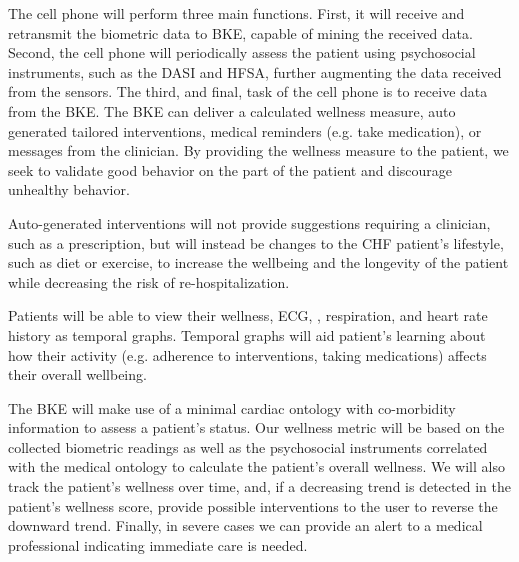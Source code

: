The cell phone will perform three main functions. First, it will receive and retransmit the biometric data to BKE, capable of mining the received data. Second, the cell phone will periodically assess the patient using psychosocial instruments, such as the DASI and HFSA, further augmenting the data received from the sensors. The third, and final, task of the cell phone is to receive data from the BKE. The BKE can deliver a calculated wellness measure, auto generated tailored interventions, medical reminders (e.g. take medication), or messages from the clinician. By providing the wellness measure to the patient, we seek to validate good behavior on the part of the patient and discourage unhealthy behavior. 

Auto-generated interventions will not provide suggestions requiring a clinician, such as a prescription, but will instead be changes to the CHF patient's lifestyle, such as diet or exercise, to increase the wellbeing and the longevity of the patient while decreasing the risk of re-hospitalization. 

Patients will be able to view their wellness, ECG, , respiration, and heart rate history as temporal graphs. Temporal graphs will aid patient's learning about how their activity (e.g. adherence to interventions, taking medications) affects their overall wellbeing.

The BKE will make use of a minimal cardiac ontology with co-morbidity information to assess a patient's status. Our wellness metric will be based on the collected biometric readings as well as the psychosocial instruments correlated with the medical ontology to calculate the patient's overall wellness. We will also track the patient's wellness over time, and, if a decreasing trend is detected in the patient's wellness score, provide possible interventions to the user to reverse the downward trend. Finally, in severe cases we can provide an alert to a medical professional indicating immediate care is needed.

